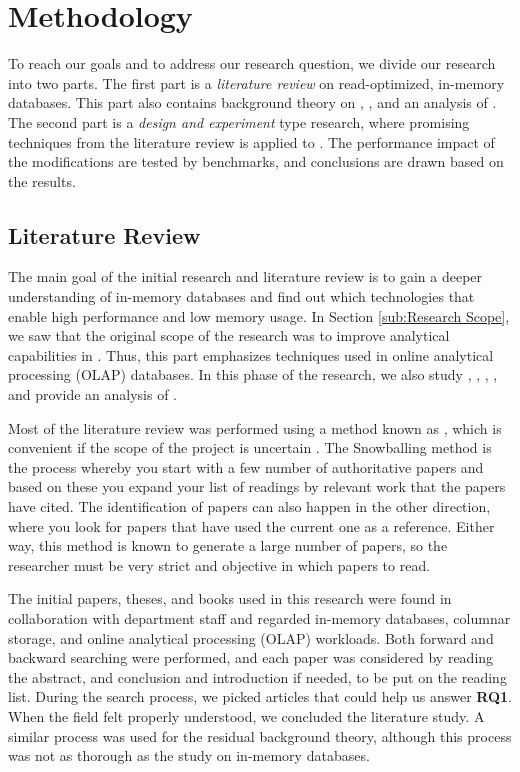 \section{Methodology}
\label{sec:Methodology}
To reach our goals and to address our research question, we divide our research into two parts. The first part is a \textit{literature review} on read-optimized, in-memory databases. This part also contains background theory on \mde, \bi, and an analysis of \gap. The second part is a \textit{design and experiment} type research, where promising techniques from the literature review is applied to \gap. The performance impact of the modifications are tested by benchmarks, and conclusions are drawn based on the results.

\subsection{Literature Review}
\label{sub:Literature Review}
The main goal of the initial research and literature review is to gain a deeper understanding of in-memory databases and find out which technologies that enable high performance and low memory usage. In Section \ref{sub:Research Scope}, we saw that the original scope of the research was to improve analytical capabilities in \gap. Thus, this part emphasizes techniques used in online analytical processing (OLAP) databases. In this phase of the research, we also study \mde, \bi, \bd, \delphi, and provide an analysis of \gap.

Most of the literature review was performed using a method known as , which is convenient if the scope of the project is uncertain \cite{Ang2014-nm}. The Snowballing method is the process whereby you start with a few number of authoritative papers and based on these you expand your list of readings by relevant work that the papers have cited. The identification of papers can also happen in the other direction, where you look for papers that have used the current one as a reference. Either way, this method is known to generate a large number of papers, so the researcher must be very strict and objective in which papers to read.

The initial papers, theses, and books used in this research were found in collaboration with department staff and regarded in-memory databases, columnar storage, and online analytical processing (OLAP) workloads. Both forward and backward searching were performed, and each paper was considered by reading the abstract, and conclusion and introduction if needed, to be put on the reading list. During the search process, we picked articles that could help us answer \textbf{RQ1}. When the field felt properly understood, we concluded the literature study. A similar process was used for the residual background theory, although this process was not as thorough as the study on in-memory databases.

